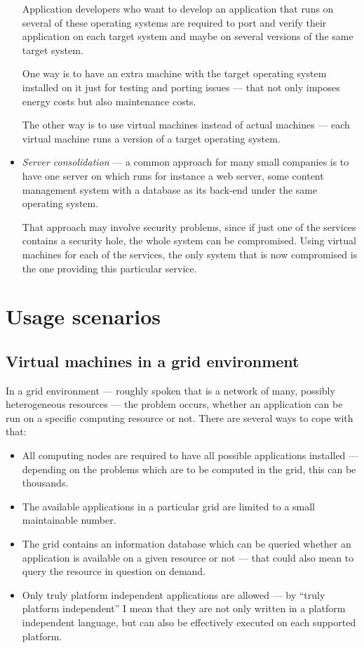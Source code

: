 \begin{itemize}
  Application developers who  want to develop an application  that runs on
  several of these operating systems are required to port and verify their
  application on each  target system and maybe on  several versions of the
  same target system.

  One way  is to have  an extra machine  with the target  operating system
  installed on  it just for testing  and porting issues ---  that not only
  imposes energy  costs but also maintenance  costs.

  The other way is to use  virtual machines instead of actual machines ---
  each virtual machine runs a version of a target operating system.
\item  \emph{Server consolidation} ---  a common  approach for  many small
  companies is to have one server on which runs for instance a web server,
  some content management system with a database as its back-end under the
  same  operating system.

  That approach  may involve security problems,  since if just  one of the
  services   contains  a   security  hole,   the  whole   system   can  be
  compromised. Using virtual  machines for each of the  services, the only
  system  that is  now compromised  is the  one providing  this particular
  service.
\end{itemize}

\section{Usage scenarios}
\label{sec:usage}

\subsection{Virtual machines in a grid environment}

In  a grid  environment ---  roughly  spoken that  is a  network of  many,
possibly  heterogeneous  resources  ---  the problem  occurs,  whether  an
application can be run on a  specific computing resource or not. There are
several ways to cope with that:

\begin{itemize}
\item All computing  nodes are required to have  all possible applications
  installed --- depending on the problems  which are to be computed in the
  grid, this can be thousands.
\item The  available applications  in a particular  grid are limited  to a
  small maintainable number.
\item  The grid  contains an  information  database which  can be  queried
  whether an application is available on  a given resource or not --- that
  could also mean to query the resource in question on demand.
\item  Only truly  platform independent  applications are  allowed  --- by
  ``truly platform independent'' I mean  that they are not only written in
  a platform independent language, but can also be effectively executed on
  each supported platform.
\end{itemize}

